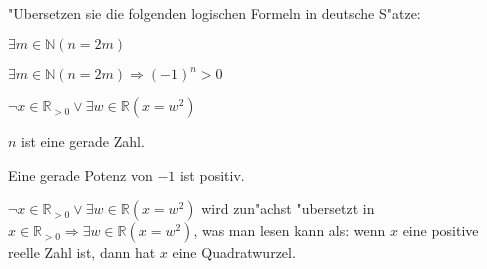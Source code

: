 "Ubersetzen sie die folgenden logischen Formeln in deutsche S"atze:
\begin{teilaufgaben}
\item $\exists m\in\mathbb N (n=2m)$
\item $\exists m\in\mathbb N (n=2m)\Rightarrow (-1)^n > 0$
\item $\neg x\in\mathbb R_{>0}\vee \exists w\in\mathbb R(x=w^2)$
\end{teilaufgaben}

\begin{loesung}
\begin{teilaufgaben}
\item $n$ ist eine gerade Zahl.
\item Eine gerade Potenz von $-1$ ist positiv.
\item $\neg x\in\mathbb R_{>0}\vee \exists w\in\mathbb R(x=w^2)$ wird zun"achst
"ubersetzt in
$x\in\mathbb R_{>0}\Rightarrow \exists w\in\mathbb R(x=w^2)$, was man lesen
kann als: wenn $x$ eine positive reelle Zahl ist, dann hat $x$ eine
Quadratwurzel.
\end{teilaufgaben}
\end{loesung}

